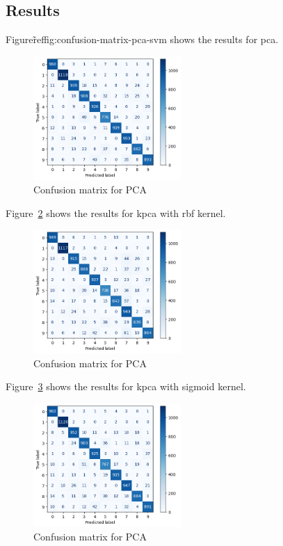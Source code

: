 \subsection{Results}
Figure\~ref{fig:confusion-matrix-pca-svm} shows the results for \gls{pca}.
\begin{figure}[htb!]
    \centering
    \includegraphics[width=0.5\textwidth]{../src/results/experiment_three/confusion_matrix_pca_svm.png}
    \caption{Confusion matrix for PCA}
    \label{fig:confusion-matrix-pca-svm}
\end{figure}


Figure~\ref{fig:confusion-matrix-kernel-pca-svm-rbf} shows the results for \gls{kpca} with rbf kernel.
\begin{figure}[htb!]
    \centering
    \includegraphics[width=0.5\textwidth]{../src/results/experiment_three/kernel_pca_rbf_kernel_49.png}
    \caption{Confusion matrix for PCA}
    \label{fig:confusion-matrix-kernel-pca-svm-rbf}
\end{figure}

Figure~\ref{fig:confusion-matrix-kernel-pca-svm-sigmoid} shows the results for \gls{kpca} with sigmoid kernel.
\begin{figure}[htb!]
    \centering
    \includegraphics[width=0.5\textwidth]{../src/results/experiment_three/confusion_matrix_kernel_pca_svm_sigmoid.png}
    \caption{Confusion matrix for PCA}
    \label{fig:confusion-matrix-kernel-pca-svm-sigmoid}
\end{figure}

